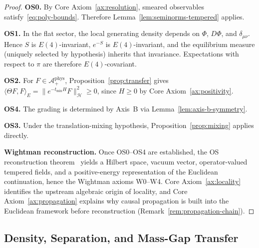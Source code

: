 \documentclass[12pt,a4paper]{article}
\theoremstyle{plain}
\theoremstyle{definition}
\theoremstyle{remark}
\newcommand{\hilb}{\mathcal{H}}
\newcommand{\alg}{\mathcal{A}}
\begin{document}
\begin{proof}
  \textbf{OS0.} By Core Axiom~\ref{ax:resolution}, smeared
  observables satisfy~\eqref{eq:poly-bounds}. Therefore
  Lemma~\ref{lem:seminorms-tempered} applies.

  \textbf{OS1.} In the flat sector, the local generating density
  depends on $\Phi$, $D\Phi$, and $\delta_{\mu\nu}$. Hence $S$ is
  $E(4)$-invariant, $e^{-S}$ is $E(4)$-invariant, and the equilibrium
  measure (uniquely selected by hypothesis) inherits that invariance.
  Expectations with respect to $\pi$ are therefore $E(4)$-covariant.

  \textbf{OS2.} For $F \in \alg^{\mathrm{phys}}_+$,
  Proposition~\ref{prop:transfer} gives
  $\langle \Theta F, F \rangle_E = \|e^{-t_{\min}H}F\|^2_\hilb \ge 0$,
  since $H \ge 0$ by Core Axiom~\ref{ax:positivity}.

  \textbf{OS4.} The grading is determined by Axis~B via
  Lemma~\ref{lem:axis-b-symmetry}.

  \textbf{OS3.} Under the translation-mixing hypothesis,
  Proposition~\ref{prop:mixing} applies directly.

  \textbf{Wightman reconstruction.} Once OS0--OS4 are established, the
  OS reconstruction theorem~\cite{OS1, OS2} yields a Hilbert space,
  vacuum vector, operator-valued tempered fields, and a positive-energy
  representation of the Euclidean continuation, hence the Wightman
  axioms W0--W4. Core Axiom~\ref{ax:locality} identifies the upstream
  algebraic origin of locality, and Core Axiom~\ref{ax:propagation}
  explains why causal propagation is built into the Euclidean
  framework before reconstruction (Remark~\ref{rem:propagation-chain}).
\end{proof}

\subsection{Density, Separation, and Mass-Gap Transfer}
\end{document}
